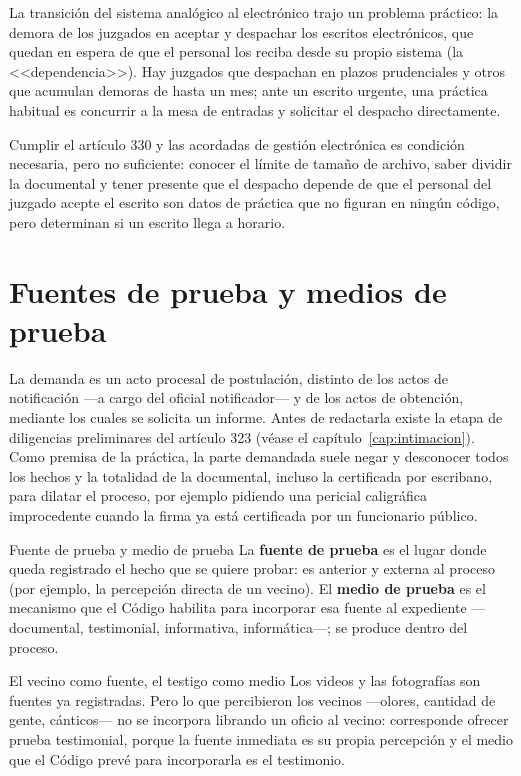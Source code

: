 \documentclass[12pt,oneside]{book}
\begin{document}
La transición del sistema analógico al electrónico trajo un problema práctico: la demora de los juzgados en aceptar y despachar los escritos electrónicos, que quedan en espera de que el personal los reciba desde su propio sistema (la <<dependencia>>). Hay juzgados que despachan en plazos prudenciales y otros que acumulan demoras de hasta un mes; ante un escrito urgente, una práctica habitual es concurrir a la mesa de entradas y solicitar el despacho directamente.

\begin{important}
Cumplir el artículo 330 y las acordadas de gestión electrónica es condición necesaria, pero no suficiente: conocer el límite de tamaño de archivo, saber dividir la documental y tener presente que el despacho depende de que el personal del juzgado acepte el escrito son datos de práctica que no figuran en ningún código, pero determinan si un escrito llega a horario.
\end{important}

\section{Fuentes de prueba y medios de prueba}

La demanda es un acto procesal de postulación, distinto de los actos de notificación ---a cargo del oficial notificador--- y de los actos de obtención, mediante los cuales se solicita un informe. Antes de redactarla existe la etapa de diligencias preliminares del artículo 323 (véase el capítulo~\ref{cap:intimacion}). Como premisa de la práctica, la parte demandada suele negar y desconocer todos los hechos y la totalidad de la documental, incluso la certificada por escribano, para dilatar el proceso, por ejemplo pidiendo una pericial caligráfica improcedente cuando la firma ya está certificada por un funcionario público.

\begin{definition}{Fuente de prueba y medio de prueba}
La \textbf{fuente de prueba} es el lugar donde queda registrado el hecho que se quiere probar: es anterior y externa al proceso (por ejemplo, la percepción directa de un vecino). El \textbf{medio de prueba} es el mecanismo que el Código habilita para incorporar esa fuente al expediente ---documental, testimonial, informativa, informática---; se produce dentro del proceso.
\end{definition}

\begin{example}{El vecino como fuente, el testigo como medio}
Los videos y las fotografías son fuentes ya registradas. Pero lo que percibieron los vecinos ---olores, cantidad de gente, cánticos--- no se incorpora librando un oficio al vecino: corresponde ofrecer prueba testimonial, porque la fuente inmediata es su propia percepción y el medio que el Código prevé para incorporarla es el testimonio.
\end{example}
\end{document}
